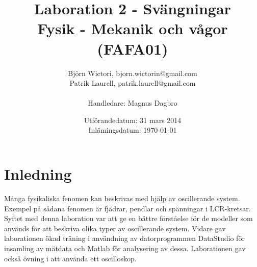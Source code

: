 \documentclass[a4paper,10pt]{article}
\title{Laboration 2 - Svängningar \\ Fysik - Mekanik och vågor (FAFA01)}
\author{Björn Wictori, bjorn.wictorin@gmail.com \\ Patrik Laurell, patrik.laurell@gmail.com \\ \\ Handledare: Magnus Dagbro}
\date{Utförandedatum: 31 mars 2014 \\ Inlämingsdatum: \today}
\begin{document}
\maketitle
\thispagestyle{empty}
\newpage
{}
\tableofcontents{}
\pagebreak


\section{Inledning}
Många fysikaliska fenomen kan beskrivas med hjälp av oscillerande system. Exempel på sådana fenomen är fjädrar, pendlar och spänningar i LCR-kretsar. Syftet med denna laboration var att ge en bättre förståelse för de modeller som används för att beskriva olika typer av oscillerande system. Vidare gav laborationen ökad träning i användning av datorprogrammen DataStudio för insamling av mätdata och Matlab för analysering av dessa. Laborationen gav också övning i att använda ett oscilloskop.
\end{document}
